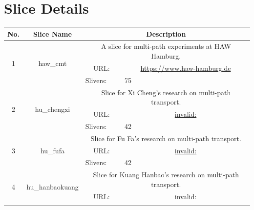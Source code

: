 \chapter{Slice Details}
\label{cha:Slice-Details}


\begin{small}
\begin{center}
\begin{longtable}{|c|c|c|c|}
 \hline
 No. & Slice Name & \multicolumn{2}{|p{20em}|}{Description} \\ \hline
 \multirow{3}{*}{1} & \multirow{3}{*}{\index{haw\_cmt}\index{Slice!haw\_cmt}haw\_cmt} & \multicolumn{2}{|p{30em}|}{A slice for multi-path experiments at HAW Hamburg.} \\* \cline{3-3}\cline{4-4}
  &  & \multicolumn{1}{|p{5em}|}{URL:} & \multicolumn{1}{|p{22.5em}|}{\url{https://www.haw-hamburg.de}} \\* \cline{3-3}\cline{4-4}
  &  & \multicolumn{1}{|l|}{Slivers:} & \multicolumn{1}{|l|}{75} \\ \hline
 \multirow{3}{*}{2} & \multirow{3}{*}{\index{hu\_chengxi}\index{Slice!hu\_chengxi}hu\_chengxi} & \multicolumn{2}{|p{30em}|}{Slice for Xi Cheng's research on multi-path transport.} \\* \cline{3-3}\cline{4-4}
  &  & \multicolumn{1}{|p{5em}|}{URL:} & \multicolumn{1}{|p{22.5em}|}{\url{invalid:}} \\* \cline{3-3}\cline{4-4}
  &  & \multicolumn{1}{|l|}{Slivers:} & \multicolumn{1}{|l|}{42} \\ \hline
 \multirow{3}{*}{3} & \multirow{3}{*}{\index{hu\_fufa}\index{Slice!hu\_fufa}hu\_fufa} & \multicolumn{2}{|p{30em}|}{Slice for Fu Fa's research on multi-path transport.} \\* \cline{3-3}\cline{4-4}
  &  & \multicolumn{1}{|p{5em}|}{URL:} & \multicolumn{1}{|p{22.5em}|}{\url{invalid:}} \\* \cline{3-3}\cline{4-4}
  &  & \multicolumn{1}{|l|}{Slivers:} & \multicolumn{1}{|l|}{42} \\ \hline
 \multirow{3}{*}{4} & \multirow{3}{*}{\index{hu\_hanbaokuang}\index{Slice!hu\_hanbaokuang}hu\_hanbaokuang} & \multicolumn{2}{|p{30em}|}{Slice for Kuang Hanbao's research on multi-path transport.} \\* \cline{3-3}\cline{4-4}
  &  & \multicolumn{1}{|p{5em}|}{URL:} & \multicolumn{1}{|p{22.5em}|}{\url{invalid:}} \\* \cline{3-3}\cline{4-4}

\end{longtable}
\end{center}
\end{small}

